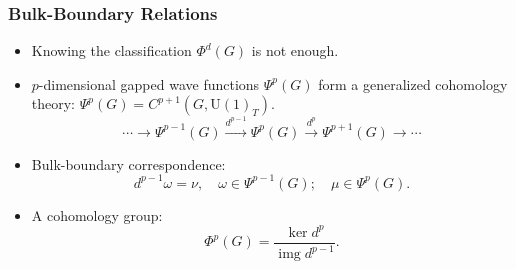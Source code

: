 \documentclass[xcolor=table, 11pt, aspectratio=169]{beamer}
\newcommand{\uone}{\mathrm U(1)}
\DeclareMathOperator{\img}{img}
\begin{document}
\begin{frame}
  \frametitle{Bulk-Boundary Relations}
  \begin{itemize}
    \item Knowing the classification $\Phi^d(G)$ is not enough.
		\item $p$-dimensional gapped wave functions $\Psi^p(G)$ form a generalized cohomology theory: $\Psi^p(G) = C^{p+1}(G,\uone_T)$.
		\[\cdots\rightarrow\Psi^{p-1}(G)\xrightarrow{d^{p-1}}\Psi^p(G)\xrightarrow{d^p}\Psi^{p+1}(G)\rightarrow\cdots\]
		\item Bulk-boundary correspondence:
		\[d^{p-1}\omega = \nu,\quad \omega\in \Psi^{p-1}(G);\quad\mu\in\Psi^p(G).\]
\begin{center}
\end{center}
  \item A cohomology group:
\[\Phi^p(G)=\frac{\ker d^p}{\img d^{p-1}}.\]
  \end{itemize}
\end{frame}
\end{document}

